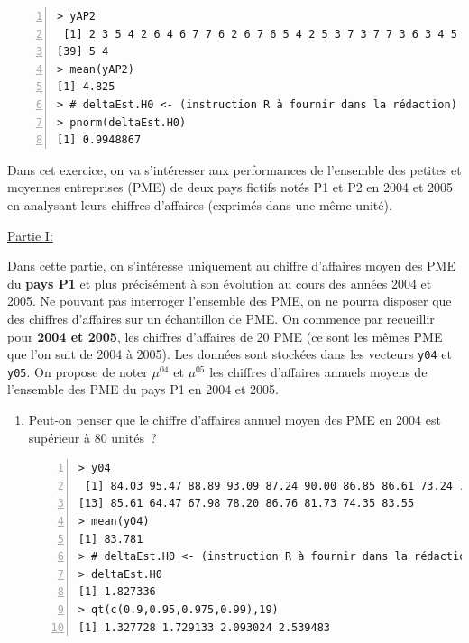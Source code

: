 \documentclass[10pt]{report}
\begin{document}
\begin{exercice}
\begin{enumerate}
\IndicR
\begin{Verbatim}[frame=leftline,fontfamily=tt,fontshape=n,numbers=left]
> yAP2
 [1] 2 3 5 4 2 6 4 6 7 7 6 2 6 7 6 5 4 2 5 3 7 3 7 7 3 6 3 4 5 5 4 7 2 4 8 7 7 3
[39] 5 4
> mean(yAP2)
[1] 4.825
> # deltaEst.H0 <- (instruction R à fournir dans la rédaction)
> pnorm(deltaEst.H0)
[1] 0.9948867
\end{Verbatim}

 




\end{enumerate}
 
\end{exercice}

\begin{exercice}

Dans cet exercice, on va s'intéresser aux performances de l'ensemble des petites et moyennes entreprises (PME) de deux pays fictifs notés P1 et P2 en 2004 et 2005 en analysant leurs chiffres d'affaires (exprimés dans une même unité).

\noindent \underline{Partie I:}

Dans cette partie, on s'intéresse uniquement au chiffre d'affaires moyen des PME du {\bf pays P1} et plus précisément à son évolution au cours des années 2004 et 2005. Ne pouvant pas interroger l'ensemble des PME, on ne pourra disposer que des chiffres d'affaires sur un échantillon de PME. On commence par recueillir pour {\bf 2004 et 2005}, les chiffres d'affaires de 20 PME (ce sont les mêmes PME que l'on suit de 2004 à 2005). Les données sont stockées dans les vecteurs \texttt{y04} et \texttt{y05}. On propose de noter $\mu^{04}$ et $\mu^{05}$ les chiffres d'affaires annuels moyens de l'ensemble des PME du pays P1 en 2004 et 2005. 


\begin{enumerate}
\item Peut-on penser que le chiffre d'affaires annuel moyen des PME en 2004 est supérieur à 80 unités~?

\IndicR
\begin{Verbatim}[frame=leftline,fontfamily=tt,fontshape=n,numbers=left]
> y04
 [1] 84.03 95.47 88.89 93.09 87.24 90.00 86.85 86.61 73.24 73.88 97.20 96.47
[13] 85.61 64.47 67.98 78.20 86.76 81.73 74.35 83.55
> mean(y04)
[1] 83.781
> # deltaEst.H0 <- (instruction R à fournir dans la rédaction)
> deltaEst.H0
[1] 1.827336
> qt(c(0.9,0.95,0.975,0.99),19)
[1] 1.327728 1.729133 2.093024 2.539483
\end{Verbatim}


\end{enumerate}
\end{exercice}
\end{document}
